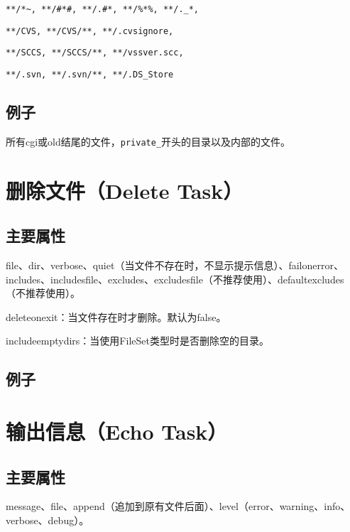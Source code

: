 \verb|**/*~, **/#*#, **/.#*, **/%*%, **/._*, |

\verb|**/CVS, **/CVS/**, **/.cvsignore, |

\verb|**/SCCS, **/SCCS/**, **/vssver.scc, |

\verb|**/.svn, **/.svn/**, **/.DS_Store |

\subsection{例子}

所有cgi或old结尾的文件，\verb|private_|开头的目录以及内部的文件。








\section{删除文件（Delete Task）}

\subsection{主要属性}

file、dir、verbose、quiet（当文件不存在时，不显示提示信息）、failonerror、includes、includesfile、excludes、excludesfile（不推荐使用）、defaultexcludes（不推荐使用）。

deleteonexit：当文件存在时才删除。默认为false。

includeemptydirs：当使用FileSet类型时是否删除空的目录。

\subsection{例子}








\section{输出信息（Echo Task）}

\subsection{主要属性}

message、file、append（追加到原有文件后面）、level（error、warning、info、verbose、debug）。


